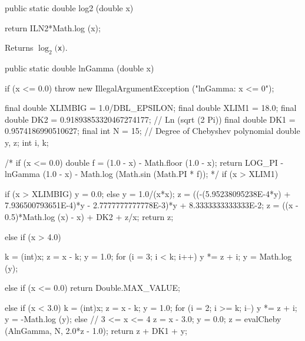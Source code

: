 \begin{htmlonly}
 \end{htmlonly}
\begin{code}

   public static double log2 (double x)\begin{hide} {
     return ILN2*Math.log (x);
   }\end{hide}
\end{code}
 \begin{tabb} Returns $\log_2 ($\texttt{x}$)$.
 \end{tabb}
 \begin{htmlonly}
 \end{htmlonly}
\begin{code}

   public static double lnGamma (double x)\begin{hide} {
      if (x <= 0.0)
         throw new IllegalArgumentException ("lnGamma:   x <= 0");

      final double XLIMBIG = 1.0/DBL_EPSILON;
      final double XLIM1 = 18.0;
      final double DK2 = 0.91893853320467274177;     // Ln (sqrt (2 Pi))
      final double DK1 = 0.9574186990510627;
      final int N = 15;              // Degree of Chebyshev polynomial
      double y, z;
      int i, k;

/*
      if (x <= 0.0) {
         double f = (1.0 - x) - Math.floor (1.0 - x);
         return LOG_PI - lnGamma (1.0 - x) - Math.log (Math.sin (Math.PI * f));
      }
*/
      if (x > XLIM1) {
         if (x > XLIMBIG)
            y = 0.0;
         else
            y = 1.0/(x*x);
         z = ((-(5.95238095238E-4*y) + 7.936500793651E-4)*y -
            2.7777777777778E-3)*y + 8.3333333333333E-2;
         z = ((x - 0.5)*Math.log (x) - x) + DK2 + z/x;
         return z;

      } else if (x > 4.0) {
         k = (int)x;
         z = x - k;
         y = 1.0;
         for (i = 3; i < k; i++)
            y *= z + i;
         y = Math.log (y);

      } else if (x <= 0.0)
         return Double.MAX_VALUE;

      else if (x < 3.0) {
         k = (int)x;
         z = x - k;
         y = 1.0;
         for (i = 2; i >= k; i--)
            y *= z + i;
         y = -Math.log (y);
      }
      else {           // 3 <= x <= 4
         z = x - 3.0;
         y = 0.0;
      }
      z = evalCheby (AlnGamma, N, 2.0*z - 1.0);
      return z + DK1 + y;
   }\end{hide}
\end{code}

